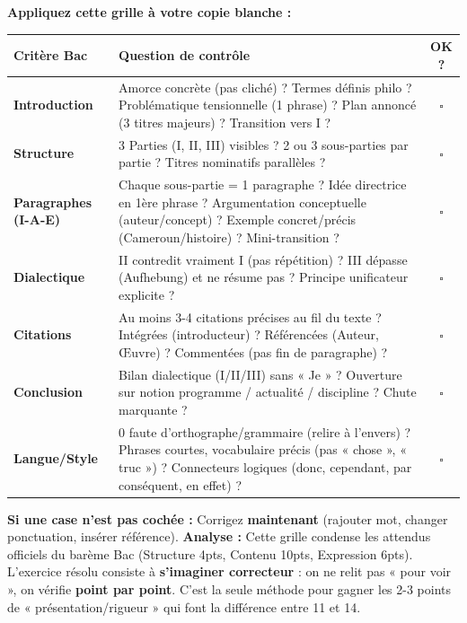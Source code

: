 \documentclass[11pt]{article}
\begin{document}
\begin{exoresolu}
\textbf{Appliquez cette grille à votre copie blanche :}
\begin{center}
\begin{tabularx}{\linewidth}{|l|X|c|}\hline
\textbf{Critère Bac} & \textbf{Question de contrôle} & \textbf{OK ?} \\ \hline
\textbf{Introduction} & Amorce concrète (pas cliché) ? Termes définis philo ? Problématique tensionnelle (1 phrase) ? Plan annoncé (3 titres majeurs) ? Transition vers I ? & $\square$ \\ \hline
\textbf{Structure} & 3 Parties (I, II, III) visibles ? 2 ou 3 sous-parties par partie ? Titres nominatifs parallèles ? & $\square$ \\ \hline
\textbf{Paragraphes (I-A-E)} & Chaque sous-partie = 1 paragraphe ? Idée directrice en 1ère phrase ? Argumentation conceptuelle (auteur/concept) ? Exemple concret/précis (Cameroun/histoire) ? Mini-transition ? & $\square$ \\ \hline
\textbf{Dialectique} & II contredit vraiment I (pas répétition) ? III dépasse (Aufhebung) et ne résume pas ? Principe unificateur explicite ? & $\square$ \\ \hline
\textbf{Citations} & Au moins 3-4 citations précises au fil du texte ? Intégrées (introducteur) ? Référencées (Auteur, Œuvre) ? Commentées (pas fin de paragraphe) ? & $\square$ \\ \hline
\textbf{Conclusion} & Bilan dialectique (I/II/III) sans « Je » ? Ouverture sur notion programme / actualité / discipline ? Chute marquante ? & $\square$ \\ \hline
\textbf{Langue/Style} & 0 faute d'orthographe/grammaire (relire à l'envers) ? Phrases courtes, vocabulaire précis (pas « chose », « truc ») ? Connecteurs logiques (donc, cependant, par conséquent, en effet) ? & $\square$ \\ \hline
\end{tabularx}
\end{center}
\textbf{Si une case n'est pas cochée :} Corrigez \textbf{maintenant} (rajouter mot, changer ponctuation, insérer référence).
\tcblower
\textbf{Analyse :} Cette grille condense les attendus officiels du barème Bac (Structure 4pts, Contenu 10pts, Expression 6pts). L'exercice résolu consiste à \textbf{s'imaginer correcteur} : on ne relit pas « pour voir », on vérifie \textbf{point par point}. C'est la seule méthode pour gagner les 2-3 points de « présentation/rigueur » qui font la différence entre 11 et 14.
\end{exoresolu}
\end{document}
